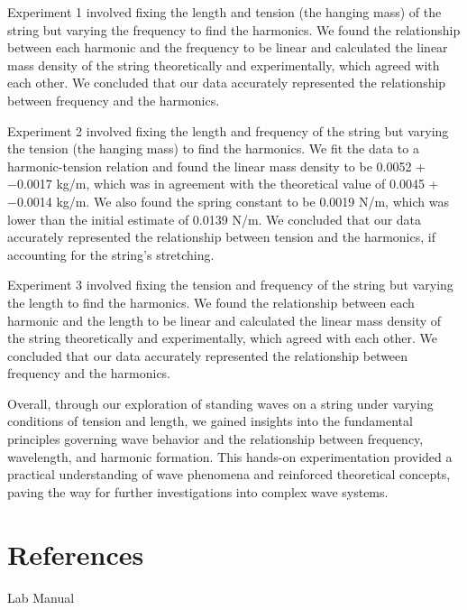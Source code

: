 \documentclass[11pt]{article}
\let\oldsection\section
\renewcommand\section{\clearpage\oldsection}
\begin{document}
    Experiment 1 involved fixing the length and tension (the hanging mass) of the string but varying the frequency to find the harmonics. We found the relationship between each harmonic and the frequency to be linear and calculated the linear mass density of the string theoretically and experimentally, which agreed with each other. We concluded that our data accurately represented the relationship between frequency and the harmonics.

    Experiment 2 involved fixing the length and frequency of the string but varying the tension (the hanging mass) to find the harmonics.
    We fit the data to a harmonic-tension relation and found the linear mass density to be 0.0052 + −0.0017 kg/m, which was in agreement with the theoretical value of 0.0045 + −0.0014 kg/m.
    We also found the spring constant to be 0.0019 N/m, which was lower than the initial estimate of 0.0139 N/m.
    We concluded that our data accurately represented the relationship between tension and the harmonics, if accounting for the string's stretching.

    Experiment 3 involved fixing the tension and frequency of the string but varying the length to find the harmonics. We found the relationship between each harmonic and the length to be linear and calculated the linear mass density of the string theoretically and experimentally, which agreed with each other. We concluded that our data accurately represented the relationship between frequency and the harmonics.

    Overall, through our exploration of standing waves on a string under varying conditions of tension and length, we gained insights into the fundamental principles governing wave behavior and the relationship between frequency, wavelength, and harmonic formation. This hands-on experimentation provided a practical understanding of wave phenomena and reinforced theoretical concepts, paving the way for further investigations into complex wave systems.
    
    \appendix
    \section{References}\label{sec:references}

    Lab Manual
\end{document}
